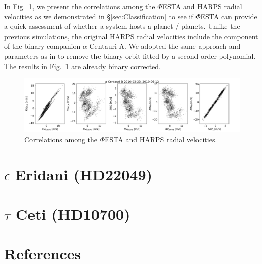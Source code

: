 
In Fig.~\ref{fig:Correlation2010}, we present the correlations among the $\mathit{\Phi}$ESTA and HARPS radial velocities as we demonstrated in \S\ref{sec:Classification} to see if $\mathit{\Phi}$ESTA can provide a quick assessment of whether a system hosts a planet / planets. Unlike the previous simulations, the original HARPS radial velocities include the component of the binary companion $\alpha$ Centauri A. We adopted the same approach and parameters as in \cite{Dumusque_Centauri_B} to remove the binary orbit fitted by a second order polynomial. The results in Fig.~\ref{fig:Correlation2010} are already binary corrected. 

\begin{figure}[tbp]
\centering
\includegraphics[width = 1.0 \linewidth]
{./Figures/Observations/Correlation2010.png}
\caption[Correlations among the $\mathit{\Phi}$ESTA and HARPS radial velocities]
		{Correlations among the $\mathit{\Phi}$ESTA and HARPS radial velocities.}
\label{fig:Correlation2010}
\end{figure} 



\section{$\epsilon$ Eridani (HD22049)}

\section{$\tau$ Ceti (HD10700)}




\pagebreak
\section{References}
\label{\thesection}
\vspace{-1.5cm}


